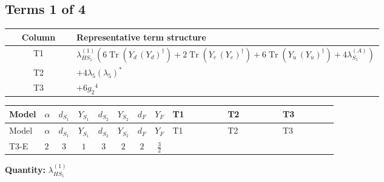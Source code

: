 \documentclass[8pt]{article}
\begin{document}
\begin{landscape}
\subsection*{Terms 1 of 4}
\begin{center}
\begin{tabular}{@{}c >{\raggedright\arraybackslash}p{0.82\linewidth}@{}}
\toprule
Column & Representative term structure \\
\midrule
T1 & \(\displaystyle {\lambda_{HS_1}^{(1)}} (6 \operatorname{Tr}\!\left({Y_d}\,\left({Y_d}\right)^{\dagger}\right)+2 \operatorname{Tr}\!\left({Y_e}\,\left({Y_e}\right)^{\dagger}\right)+6 \operatorname{Tr}\!\left({Y_u}\,\left({Y_u}\right)^{\dagger}\right)+4 {\lambda_{S_1}^{(A)}})\) \\
\midrule
T2 & \(\displaystyle +4 {\lambda_5} \left({\lambda_5}\right)^{*}\) \\
\midrule
T3 & \(\displaystyle +6 {g_2}^4\) \\
\midrule
\bottomrule
\end{tabular}
\end{center}
\smallskip
\tiny
\begin{longtable}{@{}llcccccc >{\raggedright\arraybackslash}p{0.21\linewidth} >{\raggedright\arraybackslash}p{0.21\linewidth} >{\raggedright\arraybackslash}p{0.21\linewidth}@{}}
\toprule
Model & $\alpha$ & $d_{S_1}$ & $Y_{S_1}$ & $d_{S_2}$ & $Y_{S_2}$ & $d_F$ & $Y_F$ & T1 & T2 & T3 \\
\midrule
\endfirsthead
\toprule
Model & $\alpha$ & $d_{S_1}$ & $Y_{S_1}$ & $d_{S_2}$ & $Y_{S_2}$ & $d_F$ & $Y_F$ & T1 & T2 & T3 \\
\midrule
\endhead
T3-E & $2$ & $3$ & $1$ & $3$ & $2$ & $2$ & $\frac{3}{2}$ & \scriptsize\adjustbox{max width=\linewidth}{$\begin{gathered} {\lambda_{HS_1}^{(1)}} (6 \operatorname{Tr}\!\left({Y_d}\,\left({Y_d}\right)^{\dagger}\right)+2 \operatorname{Tr}\!\left({Y_e}\,\left({Y_e}\right)^{\dagger}\right)+6 \operatorname{Tr}\!\left({Y_u}\,\left({Y_u}\right)^{\dagger}\right)+4 {\lambda_{S_1}^{(A)}})\end{gathered}$} & \scriptsize\adjustbox{max width=\linewidth}{$\begin{gathered} +4 {\lambda_5} \left({\lambda_5}\right)^{*}\end{gathered}$} & \scriptsize\adjustbox{max width=\linewidth}{$\begin{gathered} +6 {g_2}^4\end{gathered}$} \\
\midrule
\bottomrule
\end{longtable}
\clearpage
\noindent\textbf{Quantity: }$\lambda_{HS_1}^{(1)}$\par\smallskip

\end{landscape}
\end{document}
